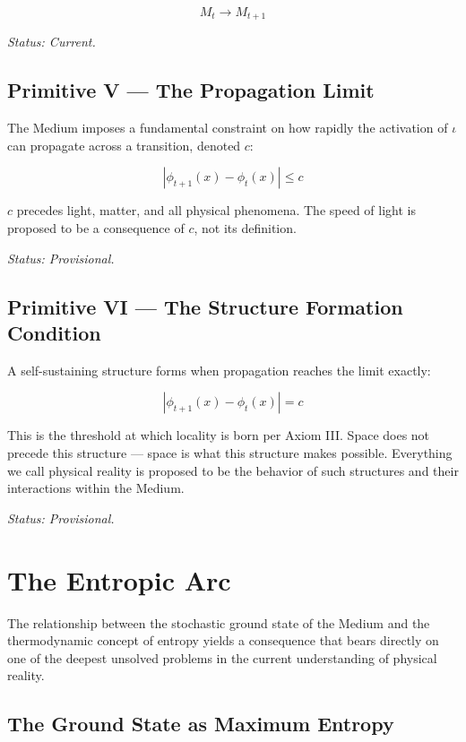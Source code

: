 \documentclass[11pt]{article}
\begin{document}
\begin{equation}
M_t \rightarrow M_{t+1}
\end{equation}

\emph{Status: Current.}
\subsection{Primitive V — The Propagation Limit}
\label{sec:org6a3bb81}

The Medium imposes a fundamental constraint on how rapidly the activation of
\(\iota\) can propagate across a transition, denoted \(c\):

\begin{equation}
|\phi_{t+1}(x) - \phi_t(x)| \leq c
\end{equation}

\(c\) precedes light, matter, and all physical phenomena. The speed of light is
proposed to be a consequence of \(c\), not its definition.

\emph{Status: Provisional.}
\subsection{Primitive VI — The Structure Formation Condition}
\label{sec:org683c62b}

A self-sustaining structure forms when propagation reaches the limit exactly:

\begin{equation}
|\phi_{t+1}(x) - \phi_t(x)| = c
\end{equation}

This is the threshold at which locality is born per Axiom III. Space does not
precede this structure — space is what this structure makes possible. Everything
we call physical reality is proposed to be the behavior of such structures and
their interactions within the Medium.

\emph{Status: Provisional.}
\section{The Entropic Arc}
\label{sec:org86f55e4}

The relationship between the stochastic ground state of the Medium and the
thermodynamic concept of entropy yields a consequence that bears directly on
one of the deepest unsolved problems in the current understanding of physical
reality.
\subsection{The Ground State as Maximum Entropy}
\label{sec:org5463a77}
\end{document}
